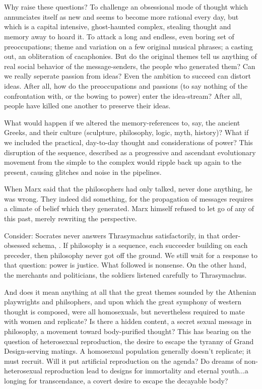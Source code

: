 \chapter{}

Why raise these questions? To challenge an obsessional mode of thought which annunciates itself as new and seems to become more rational every day, but which is a capital intensive, ghost-haunted complex, stealing thought and memory away to hoard it. To attack a long and endless, even boring set of preoccupations; theme and variation on a few original musical phrases; a casting out, an obliteration of cacaphonies. But do the original themes tell us anything of real social behavior of the message-senders, the people who generated them? Can we really seperate passion from ideas? Even the ambition to succeed can distort ideas. After all, how do the preoccupations and passions (to say nothing of the confrontation with, or the bowing to power) enter the idea-stream? After all, people have killed one another to preserve their ideas.

What would happen if we altered the memory-references to, say, the ancient Greeks, and their culture (sculpture, philosophy, logic, myth, history)? What if we included the practical, day-to-day thought and considerations of power? This disruption of the sequence, described as a progressive and ascendant evolutionary movement from the simple to the complex would ripple back up again to the present, causing glitches and noise in the pipelines.

When Marx said that the philosophers had only talked, never done anything, he was wrong. They indeed did something, for the propagation of messages requires a climate of belief which they generated. Marx himself refused to let go of any of this past, merely rewriting the perspective.

Consider: Socrates never answers Thrasymachus satisfactorily, in that order-obsessed schema, . If philosophy is a sequence, each succeeder building on each preceder, then philosophy never got off the ground. We still wait for a response to that question: power is justice. What followed is nonsense. On the other hand, the merchants and politicians, the soldiers listened carefully to Thrasymachus.

And does it mean anything at all that the great themes sounded by the Athenian playwrights and philsophers, and upon which the great symphony of western thought is composed, were all homosexuals, but nevertheless required to mate with women and replicate? Is there a hidden content, a secret sexual message in philosophy, a movement toward body-purified thought? This has bearing on the question of heterosexual reproduction, the desire to escape the tyranny of Grand Design-serving matings. A homosexual population generally doesn't replicate; it must recruit. Will it put artificial reproduction on the agenda? Do dreams of non-heterosexual reproduction lead to designs for immortality and eternal youth...a longing for transcendance, a covert desire to escape the decayable body?

